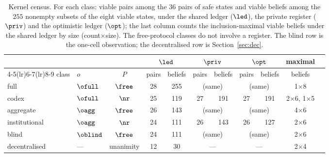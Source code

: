 \begin{table}[t]
\centering\small
\caption{Kernel census. For each class: viable pairs among the $36$ pairs of safe states and viable beliefs among the $255$ nonempty subsets of the eight viable states, under the shared ledger ($\led$), the private register ($\priv$) and the optimistic ledger ($\opt$); the last column counts the inclusion-maximal viable beliefs under the shared ledger by size (count$\times$size). The free-protocol classes do not involve a register. The blind row is the one-cell observation; the decentralised row is Section~\ref{sec:dec}.}
\label{tab:kernels}
\begin{tabular}{llccccccccl}
\toprule
 & & & \multicolumn{2}{c}{$\led$} & \multicolumn{2}{c}{$\priv$} & \multicolumn{2}{c}{$\opt$} & maximal \\
\cmidrule(lr){4-5}\cmidrule(lr){6-7}\cmidrule(lr){8-9}
class & $o$ & $P$ & pairs & beliefs & pairs & beliefs & pairs & beliefs & beliefs \\
\midrule
full & $\ofull$ & $\free$ & 28 & 255 & \multicolumn{2}{c}{(same)} & \multicolumn{2}{c}{(same)} & 1$\times$8 \\
codex & $\ofull$ & $\nr$ & 25 & 119 & 27 & 191 & 27 & 191 & 2$\times$6, 1$\times$5 \\
aggregate & $\oagg$ & $\free$ & 26 & 143 & \multicolumn{2}{c}{(same)} & \multicolumn{2}{c}{(same)} & 4$\times$6 \\
institutional & $\oagg$ & $\nr$ & 24 & 111 & 26 & 143 & 26 & 127 & 2$\times$6 \\
blind & $\oblind$ & $\free$ & 24 & 111 & \multicolumn{2}{c}{(same)} & \multicolumn{2}{c}{(same)} & 2$\times$6 \\
decentralised & --- & unanimity & 12 & 30 & \multicolumn{2}{c}{---} & \multicolumn{2}{c}{---} & 2$\times$4 \\
\bottomrule
\end{tabular}
\end{table}
